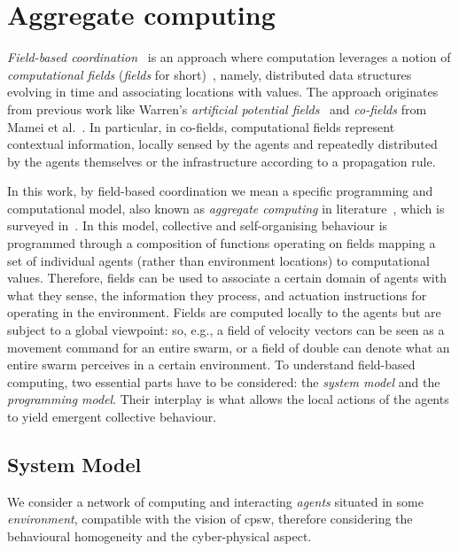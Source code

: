 \section{Aggregate computing}
\emph{Field-based coordination}~\cite{DBLP:journals/jlap/ViroliBDACP19}
 is an approach
 where computation leverages
 a notion of \emph{computational fields} (\emph{fields} for short)~\cite{DBLP:conf/icra/Warren89,DBLP:journals/pervasive/MameiZL04,DBLP:journals/jlap/ViroliBDACP19}, 
 namely, distributed data structures evolving in time and associating locations with values.
%
The approach originates from previous work
 like
 Warren's \emph{artificial potential fields}~\cite{DBLP:conf/icra/Warren89}
 and
 \emph{co-fields} from Mamei et al.~\cite{DBLP:journals/pervasive/MameiZL04}.
%
In particular, in co-fields, computational fields represent contextual information, 
 locally sensed by the agents and repeatedly distributed by the agents themselves or the infrastructure according to a propagation rule.

In this work, by field-based coordination we mean a specific programming and computational model,
 also known as \emph{aggregate computing} in literature~\cite{aggregatecomputing},
 which is surveyed in~\cite{DBLP:journals/jlap/ViroliBDACP19}.
In this model,  
 collective and self-organising behaviour
 is programmed through a composition
 of functions operating on fields
 mapping a set of individual agents (rather than environment locations)
 to computational values.
%
Therefore, fields can be used to associate a certain domain of agents
 with what they sense, the information they process, and actuation instructions for operating in the environment.
%
Fields are computed locally to the agents
 but are subject to a global viewpoint:
 so, e.g., a field of velocity vectors can be seen as a movement command for an entire swarm, or
 a field of double can denote what an entire swarm perceives in a certain environment.
%
To understand field-based computing,
 two essential parts have to be considered: the \emph{system model}
 and the \emph{programming model}.
 Their interplay is what allows the local actions of the agents
 to yield emergent collective behaviour.

\subsection{System Model}\label{ssec:background:sysmodel}
We consider a network of computing and interacting \emph{agents} situated in some \emph{environment},
 compatible with the vision of \acf{cpsw}, therefore considering the behavioural homogeneity and the 
 cyber-physical aspect. 

